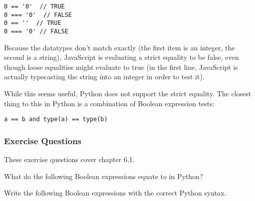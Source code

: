 \begin{lstlisting}
0 == '0'  // TRUE
0 === '0'  // FALSE
0 == ''  // TRUE
0 === '0' // FALSE
\end{lstlisting}
Because the datatypes don't match exactly (the first item is an integer, the second is a string), JavaScript is evaluating a strict equality to be false, even though loose equalities might evaluate to true (in the first line, JavaScript is actually typecasting the string into an integer in order to test it).\par
While this seems useful, Python does not support the strict equality. The closest thing to this in Python is a combination of Boolean expression tests:
\begin{lstlisting}[style=pippython]
a == b and type(a) == type(b)
\end{lstlisting}
\subsubsection*{Exercise Questions}
These exercise questions cover chapter 6.1.
\begin{Exercise}
\end{Exercise}
\begin{Exercise}
What do the following Boolean expressions equate to in Python?
\end{Exercise}
\begin{Exercise}
Write the following Boolean expressions with the correct Python syntax.
\end{Exercise}
